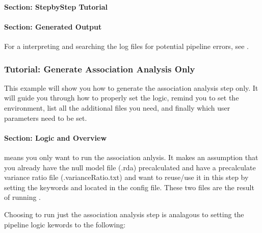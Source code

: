 \documentclass[letterpaper,10pt,english]{sphinxmanual}
\begin{document}
\paragraph{Section: Step\sphinxhyphen{}by\sphinxhyphen{}Step Tutorial}
\label{\detokenize{generateNullonlyTutorial:section-step-by-step-tutorial}}

\paragraph{Section: Generated Output}
\label{\detokenize{generateNullonlyTutorial:section-generated-output}}



For a interpreting and searching the log files for potential pipeline errors, see {\hyperref[\detokenize{parsingStdErrOut::doc}]{}}.




\subsubsection{Tutorial: Generate Association Analysis Only}
\label{\detokenize{generateAssociationOnlyTutorial:tutorial-generate-association-analysis-only}}\label{\detokenize{generateAssociationOnlyTutorial::doc}}
This example will show you how to generate the association analysis step only.  It will guide you through how to properly set the logic, remind you to set the environment, list all the additional files you need, and finally which user parameters need to be set.


\paragraph{Section: Logic and Overview}
\label{\detokenize{generateAssociationOnlyTutorial:section-logic-and-overview}}
 means you only want to run the association anlysis.  It makes an assumption that you already have the null model file (.rda) pre\sphinxhyphen{}calculated and have a pre\sphinxhyphen{}calculate variance ratio file (.varianceRatio.txt) and want to re\sphinxhyphen{}use/use it in this step by setting the keywords  and  located in the config file.  These two files are the result of running .

Choosing to run just the association analysis step is analagous to setting the pipeline logic kewords to the following:
\end{document}
